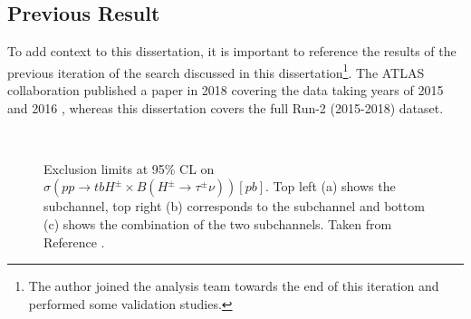 	\subsection{Previous Result}\label{ssec:Prev Hpm}
		To add context to this dissertation, it is important to reference the results of the previous iteration of the search discussed in this dissertation\footnote{The author joined the analysis team towards the end of this iteration and performed some validation studies.}. The \gls{ATLAS} collaboration published a paper in 2018 covering the data taking years of 2015 and 2016 \cite{hpm-previous}, whereas this dissertation covers the full Run-2 (2015-2018) dataset. 
		\begin{figure}[!ht]
			\centering
			 \\
			\caption{\label{fig:hpm-prev-limits} Exclusion limits at 95\% CL on $\sigma(pp \to tbH^{\pm} \times B(H^{\pm} \to \tau^\pm \nu)) [pb]$. Top left (a) shows the \taujets subchannel, top right (b) corresponds to the \taulep subchannel and bottom (c) shows the combination of the two subchannels. Taken from Reference \cite{hpm-previous}. }
		\end{figure}
